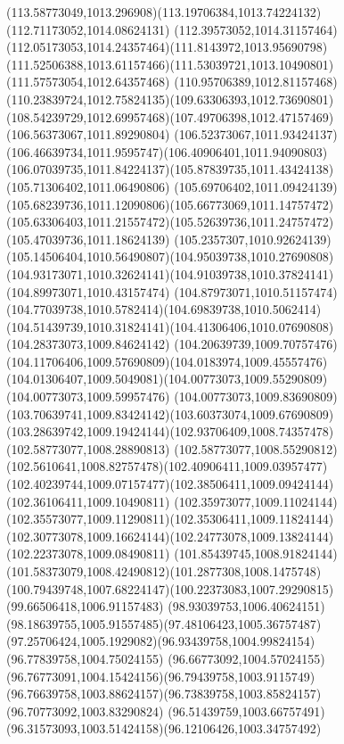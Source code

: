 {    \curveto(113.58773049,1013.296908)(113.19706384,1013.74224132)(112.71173052,1014.08624131)
    \curveto(112.39573052,1014.31157464)(112.05173053,1014.24357464)(111.8143972,1013.95690798)
    \curveto(111.52506388,1013.61157466)(111.53039721,1013.10490801)(111.57573054,1012.64357468)
    \curveto(110.95706389,1012.81157468)(110.23839724,1012.75824135)(109.63306393,1012.73690801)
    \curveto(108.54239729,1012.69957468)(107.49706398,1012.47157469)(106.56373067,1011.89290804)
    \curveto(106.52373067,1011.93424137)(106.46639734,1011.9595747)(106.40906401,1011.94090803)
    \curveto(106.07039735,1011.84224137)(105.87839735,1011.43424138)(105.71306402,1011.06490806)
    \curveto(105.69706402,1011.09424139)(105.68239736,1011.12090806)(105.66773069,1011.14757472)
    \curveto(105.63306403,1011.21557472)(105.52639736,1011.24757472)(105.47039736,1011.18624139)
    \curveto(105.2357307,1010.92624139)(105.14506404,1010.56490807)(104.95039738,1010.27690808)
    \curveto(104.93173071,1010.32624141)(104.91039738,1010.37824141)(104.89973071,1010.43157474)
    \curveto(104.87973071,1010.51157474)(104.77039738,1010.5782414)(104.69839738,1010.5062414)
    \curveto(104.51439739,1010.31824141)(104.41306406,1010.07690808)(104.28373073,1009.84624142)
    \curveto(104.20639739,1009.70757476)(104.11706406,1009.57690809)(104.0183974,1009.45557476)
    \curveto(104.01306407,1009.5049081)(104.00773073,1009.55290809)(104.00773073,1009.59957476)
    \curveto(104.00773073,1009.83690809)(103.70639741,1009.83424142)(103.60373074,1009.67690809)
    \curveto(103.28639742,1009.19424144)(102.93706409,1008.74357478)(102.58773077,1008.28890813)
    \curveto(102.58773077,1008.55290812)(102.5610641,1008.82757478)(102.40906411,1009.03957477)
    \curveto(102.40239744,1009.07157477)(102.38506411,1009.09424144)(102.36106411,1009.10490811)
    \curveto(102.35973077,1009.11024144)(102.35573077,1009.11290811)(102.35306411,1009.11824144)
    \curveto(102.30773078,1009.16624144)(102.24773078,1009.13824144)(102.22373078,1009.08490811)
    \curveto(101.85439745,1008.91824144)(101.58373079,1008.42490812)(101.2877308,1008.1475748)
    \curveto(100.79439748,1007.68224147)(100.22373083,1007.29290815)(99.66506418,1006.91157483)
    \curveto(98.93039753,1006.40624151)(98.18639755,1005.91557485)(97.48106423,1005.36757487)
    \curveto(97.25706424,1005.1929082)(96.93439758,1004.99824154)(96.77839758,1004.75024155)
    \curveto(96.66773092,1004.57024155)(96.76773091,1004.15424156)(96.79439758,1003.9115749)
    \curveto(96.76639758,1003.88624157)(96.73839758,1003.85824157)(96.70773092,1003.83290824)
    \curveto(96.51439759,1003.66757491)(96.31573093,1003.51424158)(96.12106426,1003.34757492)
}
